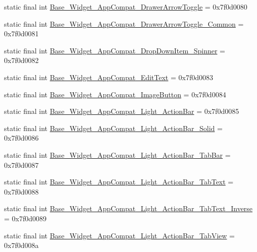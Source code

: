 \begin{DoxyCompactItemize}
static final int \mbox{\hyperlink{classandroid_1_1support_1_1design_1_1_r_1_1style_a457e1838a15856d10a8d12c916773ba4}{Base\+\_\+\+Widget\+\_\+\+App\+Compat\+\_\+\+Drawer\+Arrow\+Toggle}} = 0x7f0d0080
\item 
static final int \mbox{\hyperlink{classandroid_1_1support_1_1design_1_1_r_1_1style_a93cedb930ccfa6cadef1eb29de1a73b7}{Base\+\_\+\+Widget\+\_\+\+App\+Compat\+\_\+\+Drawer\+Arrow\+Toggle\+\_\+\+Common}} = 0x7f0d0081
\item 
static final int \mbox{\hyperlink{classandroid_1_1support_1_1design_1_1_r_1_1style_ac59d3c95c31fbc0c8a6c60261592935e}{Base\+\_\+\+Widget\+\_\+\+App\+Compat\+\_\+\+Drop\+Down\+Item\+\_\+\+Spinner}} = 0x7f0d0082
\item 
static final int \mbox{\hyperlink{classandroid_1_1support_1_1design_1_1_r_1_1style_ac849b9e899a3938f5c47c1e3c4d9d907}{Base\+\_\+\+Widget\+\_\+\+App\+Compat\+\_\+\+Edit\+Text}} = 0x7f0d0083
\item 
static final int \mbox{\hyperlink{classandroid_1_1support_1_1design_1_1_r_1_1style_a8cde79b859ab01b253a85b63a48d06d8}{Base\+\_\+\+Widget\+\_\+\+App\+Compat\+\_\+\+Image\+Button}} = 0x7f0d0084
\item 
static final int \mbox{\hyperlink{classandroid_1_1support_1_1design_1_1_r_1_1style_af936e54423ddc9b9176aef1004342be3}{Base\+\_\+\+Widget\+\_\+\+App\+Compat\+\_\+\+Light\+\_\+\+Action\+Bar}} = 0x7f0d0085
\item 
static final int \mbox{\hyperlink{classandroid_1_1support_1_1design_1_1_r_1_1style_a9360c0e55ae8bf9ef5b45cec4d1ccb6c}{Base\+\_\+\+Widget\+\_\+\+App\+Compat\+\_\+\+Light\+\_\+\+Action\+Bar\+\_\+\+Solid}} = 0x7f0d0086
\item 
static final int \mbox{\hyperlink{classandroid_1_1support_1_1design_1_1_r_1_1style_a220f9db69bc055885e7b9434ac9c5abe}{Base\+\_\+\+Widget\+\_\+\+App\+Compat\+\_\+\+Light\+\_\+\+Action\+Bar\+\_\+\+Tab\+Bar}} = 0x7f0d0087
\item 
static final int \mbox{\hyperlink{classandroid_1_1support_1_1design_1_1_r_1_1style_adc7f1b36997f04d77852dd8510e6e408}{Base\+\_\+\+Widget\+\_\+\+App\+Compat\+\_\+\+Light\+\_\+\+Action\+Bar\+\_\+\+Tab\+Text}} = 0x7f0d0088
\item 
static final int \mbox{\hyperlink{classandroid_1_1support_1_1design_1_1_r_1_1style_a30acc6e75adeb415d02ac0eaf0fe96e3}{Base\+\_\+\+Widget\+\_\+\+App\+Compat\+\_\+\+Light\+\_\+\+Action\+Bar\+\_\+\+Tab\+Text\+\_\+\+Inverse}} = 0x7f0d0089
\item 
static final int \mbox{\hyperlink{classandroid_1_1support_1_1design_1_1_r_1_1style_a60c463b25e5453155c43096e82d13589}{Base\+\_\+\+Widget\+\_\+\+App\+Compat\+\_\+\+Light\+\_\+\+Action\+Bar\+\_\+\+Tab\+View}} = 0x7f0d008a

\end{DoxyCompactItemize}
